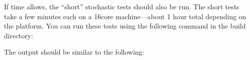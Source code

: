 \documentclass[letterpaper,10pt,english]{sphinxmanual}
\begin{document}
\begin{sphinxVerbatim}[commandchars=\\\{\}]
    
\end{sphinxVerbatim}

If time allows, the “short” stochastic tests should also be run.
The short tests take a few minutes each on a 16\sphinxhyphen{}core machine—about 1 hour total depending on the platform. You can run these tests using the following command in the
build directory:

\begin{sphinxVerbatim}[commandchars=\\\{\}]
      
\end{sphinxVerbatim}

The output should be similar to the following:
\end{document}
